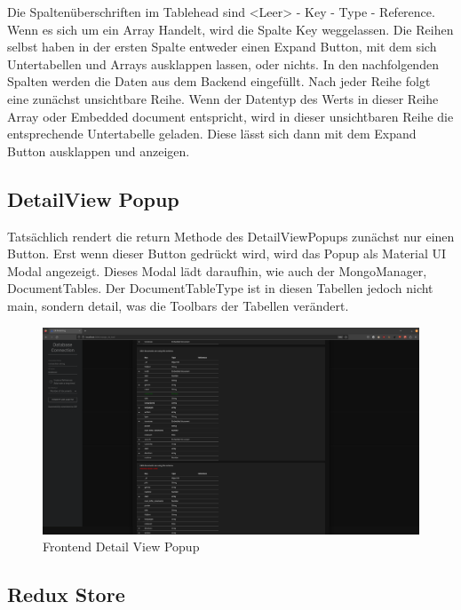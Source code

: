 Die Spaltenüberschriften im Tablehead sind <Leer> - Key - Type - Reference.
Wenn es sich um ein Array Handelt, wird die Spalte Key weggelassen.
Die Reihen selbst haben in der ersten Spalte entweder einen Expand Button, mit dem sich Untertabellen und Arrays ausklappen lassen, oder nichts.
In den nachfolgenden Spalten werden die Daten aus dem Backend eingefüllt.
Nach jeder Reihe folgt eine zunächst unsichtbare Reihe.
Wenn der Datentyp des Werts in dieser Reihe Array oder Embedded document entspricht, wird in dieser unsichtbaren Reihe die entsprechende Untertabelle geladen.
Diese lässt sich dann mit dem Expand Button ausklappen und anzeigen.


\subsection{DetailView Popup}
\label{sub:fe_detail_view}

Tatsächlich rendert die return Methode des DetailViewPopups zunächst nur einen Button. 
Erst wenn dieser Button gedrückt wird, wird das Popup als Material UI Modal angezeigt.
Dieses Modal lädt daraufhin, wie auch der MongoManager, DocumentTables.
Der DocumentTableType ist in diesen Tabellen jedoch nicht main, sondern detail, was die Toolbars der Tabellen verändert.


\begin{figure}[H]
    \includegraphics[width=\textwidth]{images/frontend_detail_view}
    \caption{Frontend Detail View Popup}
    \label{fig:frontend_detail_view}
\end{figure}

\subsection{Redux Store}
\label{sub:fe_redux}

